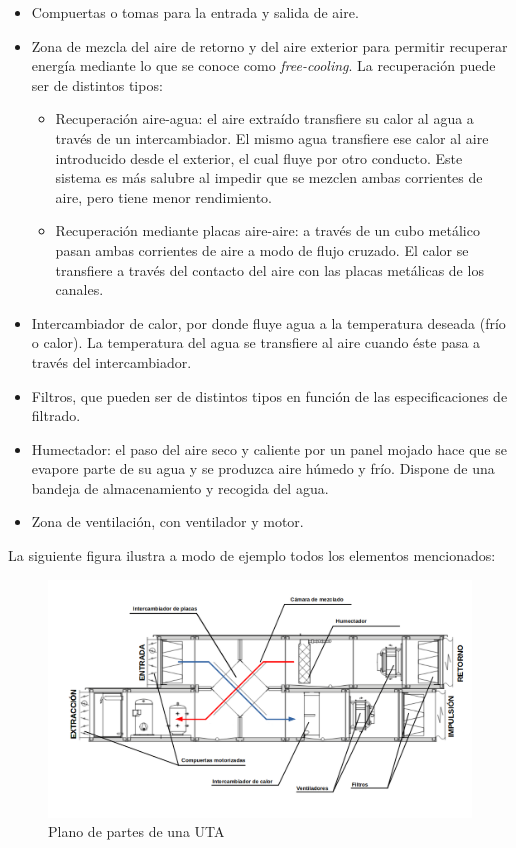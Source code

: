 \begin{itemize}
    \item Compuertas o tomas para la entrada y salida de aire.
    \item Zona de mezcla del aire de retorno y del aire exterior para permitir recuperar energía mediante lo que se conoce como \textit{free-cooling}. La recuperación puede ser de distintos tipos:
    \begin{itemize}
        \item Recuperación aire-agua: el aire extraído transfiere su calor al agua a través de un intercambiador. El mismo agua transfiere ese calor al aire introducido desde el exterior, el cual fluye por otro conducto. Este sistema es más salubre al impedir que se mezclen ambas corrientes de aire, pero tiene menor rendimiento.
        \item Recuperación mediante placas aire-aire: a través de un cubo metálico pasan ambas corrientes de aire a modo de flujo cruzado. El calor se transfiere a través del contacto del aire con las placas metálicas de los canales.
    \end{itemize}
    \item Intercambiador de calor, por donde fluye agua a la temperatura deseada (frío o calor). La temperatura del agua se transfiere al aire cuando éste pasa a través del intercambiador.
    \item Filtros, que pueden ser de distintos tipos en función de las especificaciones de filtrado.
    \item Humectador: el paso del aire seco y caliente por un panel mojado hace que se evapore parte de su agua y se produzca aire húmedo y frío. Dispone de una bandeja de almacenamiento y recogida del agua.
    \item Zona de ventilación, con ventilador y motor.
\end{itemize}

La siguiente figura ilustra a modo de ejemplo todos los elementos mencionados:

\begin{figure}[H]
    \centering
    \includegraphics[width=\textwidth, keepaspectratio]{img/esquemaUTA}
    \caption{Plano de partes de una UTA}
    \label{figura:esquemaUTA}
\end{figure}
